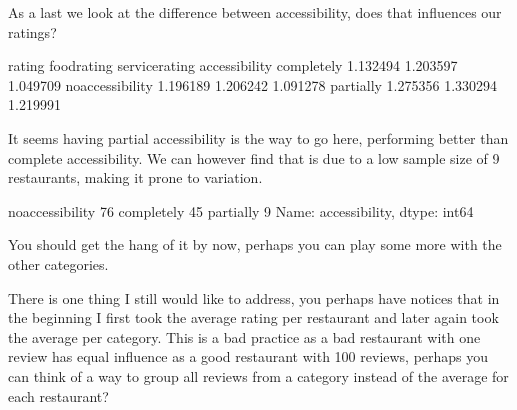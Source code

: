 \documentclass[letterpaper,10pt,english]{jupyterBook}
\begin{document}
\sphinxAtStartPar
As a last we look at the difference between accessibility, does that influences our ratings?

\begin{sphinxVerbatim}[commandchars=\\\{\}]
\PYG{p}{[}\PYG{p}{[}  \PYG{p}{]}\PYG{p}{]}
\end{sphinxVerbatim}

\begin{sphinxVerbatim}[commandchars=\\\{\}]
                    rating  food\PYGZus{}rating  service\PYGZus{}rating
accessibility                                          
completely        1.132494     1.203597        1.049709
no\PYGZus{}accessibility  1.196189     1.206242        1.091278
partially         1.275356     1.330294        1.219991
\end{sphinxVerbatim}

\sphinxAtStartPar
It seems having partial accessibility is the way to go here, performing better than complete accessibility.
We can however find that is due to a low sample size of 9 restaurants, making it prone to variation.

\begin{sphinxVerbatim}[commandchars=\\\{\}]
\end{sphinxVerbatim}

\begin{sphinxVerbatim}[commandchars=\\\{\}]
no\PYGZus{}accessibility    76
completely          45
partially            9
Name: accessibility, dtype: int64
\end{sphinxVerbatim}

\sphinxAtStartPar
You should get the hang of it by now, perhaps you can play some more with the other categories.

\sphinxAtStartPar
There is one thing I still would like to address, you perhaps have notices that in the beginning I first took the average rating per restaurant and later again took the average per category.
This is a bad practice as a bad restaurant with one review has equal influence as a good restaurant with 100 reviews, perhaps you can think of a way to group all reviews from a category instead of the average for each restaurant?
\end{document}
